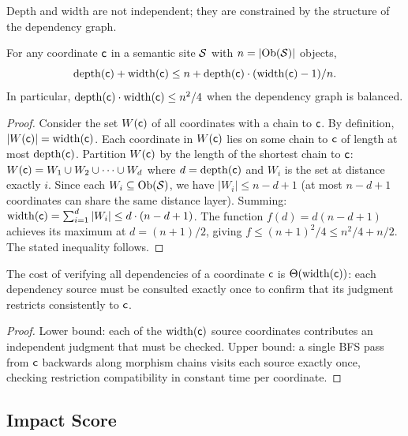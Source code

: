 \documentclass[11pt]{article}
\newcommand{\DepDepth}{\mathrm{depth}}
\newcommand{\DepWidth}{\mathrm{width}}
\begin{document}
Depth and width are not independent; they are constrained by the structure
of the dependency graph.

\begin{theorem}\label{thm:depth-width}
For any coordinate $\mathsf{c}$ in a semantic site $\mathcal{S}$ with
$n = |\mathrm{Ob}(\mathcal{S})|$ objects,
\[
  \DepDepth(\coord) + \DepWidth(\coord) \leq n + \DepDepth(\coord) \cdot
  (\DepWidth(\coord) - 1) / n.
\]
In particular, $\DepDepth(\coord) \cdot \DepWidth(\coord) \leq n^2 / 4$
when the dependency graph is balanced.
\end{theorem}

\begin{proof}
Consider the set $W(\mathsf{c})$ of all coordinates with a chain to $\mathsf{c}$.
By definition, $|W(\coord)| = \DepWidth(\coord)$.  Each coordinate in
$W(\mathsf{c})$ lies on some chain to $\mathsf{c}$ of length at most
$\DepDepth(\coord)$.  Partition $W(\mathsf{c})$ by the length of the shortest
chain to $\mathsf{c}$: $W(\mathsf{c}) = W_1 \cup W_2 \cup \cdots \cup W_d$ where
$d = \DepDepth(\coord)$ and $W_i$ is the set at distance exactly $i$.
Since each $W_i \subseteq \mathrm{Ob}(\mathcal{S})$, we have $|W_i| \leq n - d + 1$
(at most $n - d + 1$ coordinates can share the same distance layer).
Summing: $\DepWidth(\coord) = \sum_{i=1}^{d} |W_i| \leq d \cdot (n - d + 1)$.
The function $f(d) = d(n - d + 1)$ achieves its maximum at
$d = (n+1)/2$, giving $f \leq (n+1)^2/4 \leq n^2/4 + n/2$.  The stated
inequality follows.
\end{proof}

\begin{lemma}\label{lem:width-cost}
The cost of verifying all dependencies of a coordinate $\mathsf{c}$ is
$\Theta(\DepWidth(\coord))$: each dependency source must be consulted
exactly once to confirm that its judgment restricts consistently to
$\mathsf{c}$.
\end{lemma}

\begin{proof}
Lower bound: each of the $\DepWidth(\coord)$ source coordinates contributes
an independent judgment that must be checked.  Upper bound: a single BFS
pass from $\mathsf{c}$ backwards along morphism chains visits each source
exactly once, checking restriction compatibility in constant time per
coordinate.
\end{proof}

\subsection{Impact Score}\label{sec:impact-score}
\end{document}
